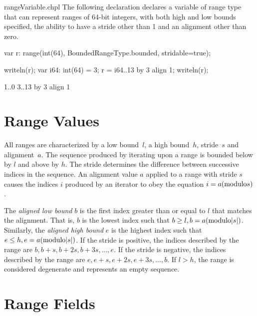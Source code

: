 \begin{chapelexample}{rangeVariable.chpl}
The following declaration declares a variable 
of range type that can represent ranges of 64-bit integers, with both
high and low bounds specified, the ability to have a stride other
than 1 and an alignment other than zero.
\begin{chapel}
var r: range(int(64), BoundedRangeType.bounded, stridable=true);
\end{chapel}
\begin{chapelpost}
writeln(r);
var i64: int(64) = 3;
r = i64..13 by 3 align 1;
writeln(r);
\end{chapelpost}
\begin{chapeloutput}
1..0
3..13 by 3 align 1
\end{chapeloutput}
\end{chapelexample}

\section{Range Values}
\label{Range_Values}

All ranges are characterized by a low bound~$l$, a high bound~$h$, stride~$s$
and alignment~$a$.  The sequence produced by iterating upon a range is bounded
below by $l$ and above by $h$.  The stride determines the difference between
successive indices in the sequence.  An alignment value $a$ applied to a range
with stride $s$ causes the indices $i$ produced by an iterator to obey the
equation $i = a ({\rm modulo} s)$.

The \emph{aligned low bound} $b$ is the first index greater than or equal to $l$
that matches the alignment.  That is, $b$ is the lowest index such that $b \geq
l, b = a ({\rm modulo} |s|)$.  Similarly, the \emph{aligned high bound} $e$ is
the highest index such that $e \leq h, e = a ({\rm modulo} |s|)$.
If the stride is positive, the indices
described by the range are $b, b+s, b+2s, b+3s, ..., e$.
If the stride is negative, the indices
described by the range are $e, e+s, e+2s, e+3s, ..., b$.
If $l > h$, the range is considered
degenerate and represents an empty sequence. 

\section{Range Fields}
\label{Range_Fields}

